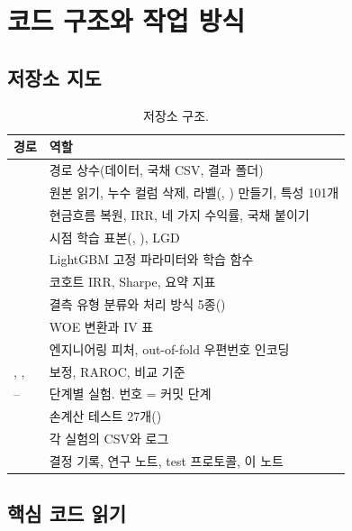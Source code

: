 \chapter{코드 구조와 작업 방식}

\section{저장소 지도}
\begin{table}[H]\centering\small
\begin{tabularx}{\linewidth}{@{}p{38mm}L@{}}\toprule
경로 & 역할\\\midrule
{} & 경로 상수(데이터, 국채 CSV, 결과 폴더)\\
 & 원본 읽기, 누수 컬럼 삭제, 라벨(, ) 만들기, 특성 101개\\
 & 현금흐름 복원, IRR, 네 가지 수익률, 국채 붙이기\\
 & 시점 학습 표본(, ), LGD\\
 & LightGBM 고정 파라미터와 학습 함수\\
 & 코호트 IRR, Sharpe, 요약 지표\\
 & 결측 유형 분류와 처리 방식 5종()\\
 & WOE 변환과 IV 표\\
 & 엔지니어링 피처, out-of-fold 우편번호 인코딩\\
, ,  & 보정, RAROC, 비교 기준\\
-- & 단계별 실험. 번호 = 커밋 단계\\
 & 손계산 테스트 27개()\\
 & 각 실험의 CSV와 로그\\
 & 결정 기록, 연구 노트, test 프로토콜, 이 노트\\\bottomrule
\end{tabularx}
\caption{저장소 구조.}
\end{table}

\section{핵심 코드 읽기}
